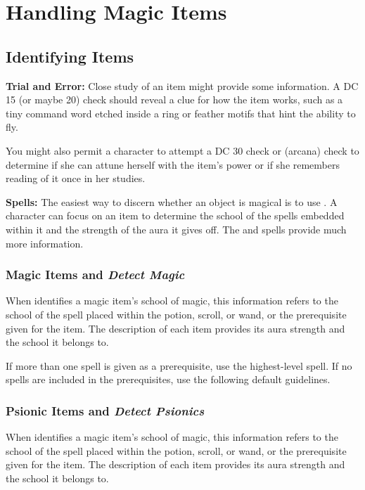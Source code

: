 \section{Handling Magic Items}

\subsection{Identifying Items}
\textbf{Trial and Error:} Close study of an item might provide some information. A DC 15 (or maybe 20)  check should reveal a clue for how the item works, such as a tiny command word etched inside a ring or feather motifs that hint the ability to fly.

You might also permit a character to attempt a DC 30  check or  (arcana) check to determine if she can attune herself with the item's power or if she remembers reading of it once in her studies.

\textbf{Spells:} The easiest way to discern whether an object is magical is to use . A character can focus on an item to determine the school of the spells embedded within it and the strength of the aura it gives off. The  and  spells provide much more information.

\subsubsection{Magic Items and \emph{Detect Magic}}
When  identifies a magic item's school of magic, this information refers to the school of the spell placed within the potion, scroll, or wand, or the prerequisite given for the item. The description of each item provides its aura strength and the school it belongs to.

If more than one spell is given as a prerequisite, use the highest-level spell. If no spells are included in the prerequisites, use the following default guidelines.


\subsubsection{Psionic Items and \emph{Detect Psionics}}
When  identifies a magic item's school of magic, this information refers to the school of the spell placed within the potion, scroll, or wand, or the prerequisite given for the item. The description of each item provides its aura strength and the school it belongs to.

